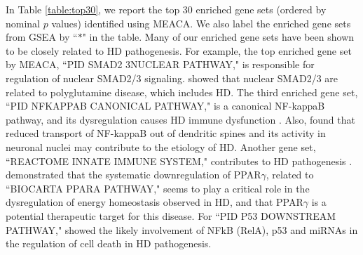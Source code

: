 \documentclass[a4,center,fleqn]{NAR}
\newcommand{\OurMethod}{MEACA}
\begin{document}
	In Table \ref{table:top30}, we report the top 30 enriched gene sets (ordered by nominal $p$ 
	values) identified using \OurMethod. We also label the enriched gene sets from GSEA by 
	``$\ast$" in the table. Many of our enriched gene sets have been shown to be closely related to 
	HD pathogenesis. For example, the top enriched gene set by \OurMethod, ``PID SMAD2 3NUCLEAR 
	PATHWAY," is responsible for regulation of nuclear SMAD2/3 signaling. 
	\citet{katsuno2010disrupted} showed that nuclear SMAD2/3 are
	related to polyglutamine disease, which includes HD. The third enriched gene set, ``PID NFKAPPAB
	CANONICAL PATHWAY," is a canonical NF-kappaB pathway, and its dysregulation causes HD immune
	dysfunction \citep{trager2014htt}. Also, \citet{marcora2010huntington} found that reduced 
	transport of NF-kappaB out of dendritic spines and its activity in neuronal nuclei may 
	contribute to the etiology of HD. 
	Another gene set, ``REACTOME INNATE IMMUNE SYSTEM," contributes to HD pathogenesis
	\citep{labadorf2015rna,trager2014htt}. %
	\citet{chiang2010modulation} demonstrated that the systematic downregulation of PPAR$\gamma$,
	related to ``BIOCARTA PPARA PATHWAY," seems to play a critical role in the dysregulation of 
	energy homeostasis observed in HD, and that PPAR$\gamma$ is a potential therapeutic target for 
	this disease. %
	For ``PID P53 DOWNSTREAM PATHWAY," \citet{ghose2011regulation} showed the likely involvement of 
	NFkB (RelA), p53 and miRNAs in the regulation of cell death in HD pathogenesis. 
	
\end{document}
